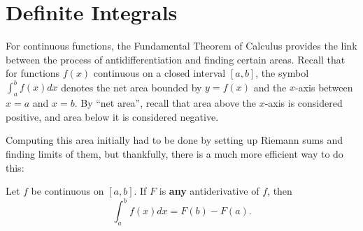 \documentclass[nooutcomes]{ximera}
\begin{document}
\section{Definite Integrals}
For continuous functions, the Fundamental Theorem of Calculus provides the link between the process of antidifferentiation and finding certain areas.  Recall that for functions $f(x)$ continuous on a closed interval $[a,b]$, the symbol $\int_a^b f(x)  dx$ denotes the net area bounded by $y=f(x)$ and the $x$-axis between $x=a$ and $x=b$.  By ``net area'', recall that area above the $x$-axis is considered positive, and area below it is considered negative.  

Computing this area initially had to be done by setting up Riemann sums and finding limits of them, but thankfully, there is a much more efficient way to do this:  


\begin{theorem}
  Let $f$ be continuous on $[a,b]$. If $F$ is \textbf{any}
  antiderivative of $f$, then
  \[
  \int_a^b f(x) dx = F(b)-F(a).
  \]
\end{theorem}
\end{document}
